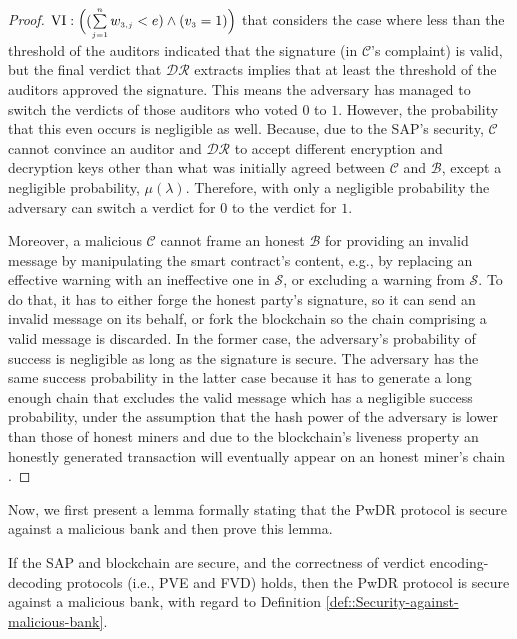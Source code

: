 \begin{proof}
 $\text{\MakeUppercase{\romannumeral 6}}: \Big((\sum\limits_{\st j=1}^{\st n}w_{\st 3,j}< {e}) \wedge ( {v}_{\st 3}=1)\Big)$ that considers the case where less than the threshold of the auditors indicated that the signature (in $\mathcal{C}$'s complaint) is valid, but   the final verdict that $\mathcal{DR}$ extracts implies that at least the threshold of the auditors approved the signature. This means the adversary has managed to switch the verdicts of those auditors who voted $0$ to $1$. However, the probability that this even occurs is negligible as well. Because, due to the SAP's security,  $\mathcal{C}$ cannot convince an auditor and $\mathcal{DR}$ to accept different encryption and decryption keys other than what was initially agreed between $\mathcal{C}$ and $\mathcal{B}$, except a negligible probability, $\mu(\lambda)$.  Therefore, with only a negligible probability the adversary can switch a verdict for $0$ to the verdict for $1$. 
 
 
 Moreover, a malicious $\mathcal{C}$ cannot frame an honest $\mathcal{B}$ for providing an invalid message by manipulating the smart contract’s content,  e.g., by replacing an effective warning with an ineffective one in $\mathcal{S}$, or excluding a warning from $\mathcal{S}$. To do that, it has to either forge the honest party’s signature, so it can send an invalid message on its behalf, or fork the blockchain so the chain comprising a valid message is discarded. In the former case, the adversary’s probability of success is negligible as long as the signature is secure. The adversary has the same success probability in the latter case because it has to generate a long enough chain that excludes the valid message which has a negligible success probability, under the assumption that the hash power of the adversary is lower than those of honest miners and due to the blockchain’s liveness property an honestly generated transaction will eventually appear on an honest miner’s chain \cite{GarayKL15}. 
\end{proof}


Now, we first present a lemma formally stating that the PwDR protocol is secure against a malicious bank and then prove this lemma. 

\begin{lemma}\label{lemma::secure-against-a-malicious-bank} If the  SAP and  blockchain are secure, and the correctness of verdict encoding-decoding protocols (i.e., PVE and FVD) holds, then the PwDR protocol is secure against a malicious bank, with regard to Definition \ref{def::Security-against-malicious-bank}. 
\end{lemma}



